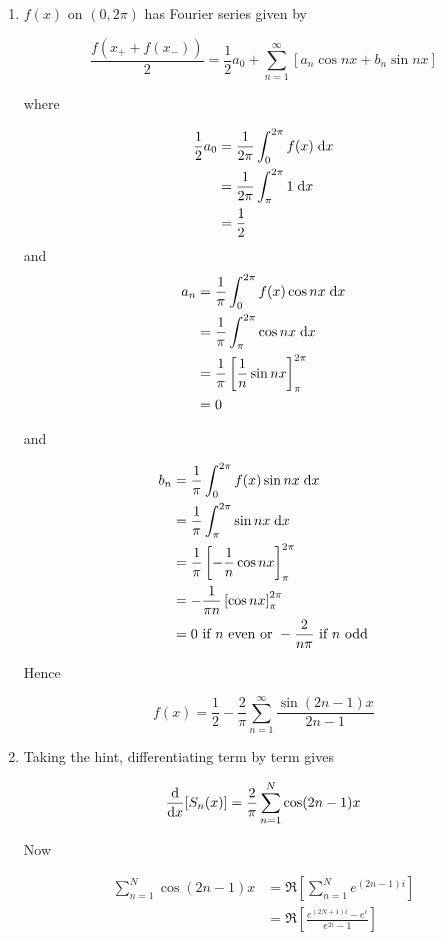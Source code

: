 \documentclass[a4paper]{article}
\begin{document}
\begin{enumerate}
	\item \begin{center}
\end{center}


$ f(x) $ on $ (0,2\pi) $ has Fourier series given by 


\[ \frac{f(x_{+} + f(x_{-}))}{2} = \frac{1}{2} a_{0} + \sum_{n=1}^{\infty} \left[ a_{n} \cos n x + b_{n} \sin n x  \right]  \]


where 

\begin{align*}
\frac{1}{2} a_{0} & = \frac{1}{2\pi} \int_{0}^{2\pi} f(x) \; \mathrm{d} x \\
& = \frac{1}{2\pi} \int_{\pi}^{2\pi} 1 \; \mathrm{d} x \\
& = \frac{1}{2}
\end{align*}
and 
\begin{align*}
a_{n} & = \frac{1}{\pi} \int_{0}^{2\pi} f(x) \cos n x    \; \mathrm{d} x  \\
& = \frac{1}{\pi} \int_{\pi}^{2\pi} \cos n x \; \mathrm{d} x \\
& = \frac{1}{\pi} \left[  \frac{1}{n} \sin n x \right]_{\pi}^{2\pi} \\
& = 0
\end{align*}

and 

\begin{align*}
b_{n} & = \frac{1}{\pi} \int_{0}^{2\pi} f(x) \sin n x    \; \mathrm{d} x  \\
& = \frac{1}{\pi} \int_{\pi}^{2\pi} \sin n x \; \mathrm{d} x \\
& = \frac{1}{\pi} \left[  -\frac{1}{n} \cos n x \right]_{\pi}^{2\pi} \\
& = - \frac{1}{\pi n} \left[ \cos n x  \right]_{\pi}^{2\pi} \\
& = 0 \text{ if }  n \text{ even or } - \frac{2}{n \pi} \text{ if } n \text{ odd}  
\end{align*}

Hence 

\[ f(x) = \frac{1}{2}  - \frac{2}{\pi} \sum_{n=1}^{\infty} \frac{\sin(2n -1)x}{2n - 1}  \]

\item Taking the hint, differentiating term by term gives

\[ \frac{\mathrm{d} }{\mathrm{d} x} [S_{n}(x)] = \frac{2}{\pi} \sum_{n=1}^{N} \cos(2n-1)x \]

Now

\begin{align*}
\sum_{n=1}^{N} \cos(2n-1)x & = \Re \left[  \sum_{n=1}^{N} e^{(2n-1)i} \right]   \\
& = \Re \left[  \frac{e^{(2N + 1)i} - e^{i}}{e^{2i} - 1} \right] 
\end{align*}
	

	
	
	
\end{enumerate}
\end{document}
